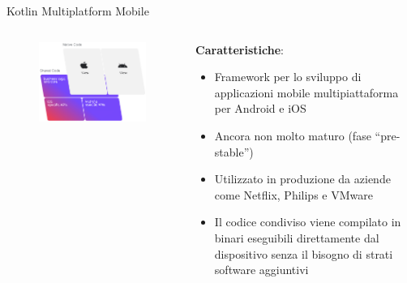 \begin{frame}{Kotlin Multiplatform Mobile}
    \begin{columns}[onlytextwidth]
        \begin{column}{0.55\textwidth}
        
             \begin{figure}[H]
                \includegraphics[width=1\textwidth]{img/kmm-stack-official.png}
            \end{figure}
            
        \end{column}
        \begin{column}{0.45\textwidth}
        
            \textbf{Caratteristiche}:
            \begin{itemize}
                \item Framework per lo sviluppo di applicazioni mobile multipiattaforma per Android e iOS
                \item Ancora non molto maturo (fase ``pre-stable'')
                \item Utilizzato in produzione da aziende come Netflix, Philips e VMware
                \item Il codice condiviso viene compilato in binari eseguibili direttamente dal dispositivo senza il bisogno di strati software aggiuntivi
            \end{itemize}
            
        \end{column}
    \end{columns}
\end{frame}